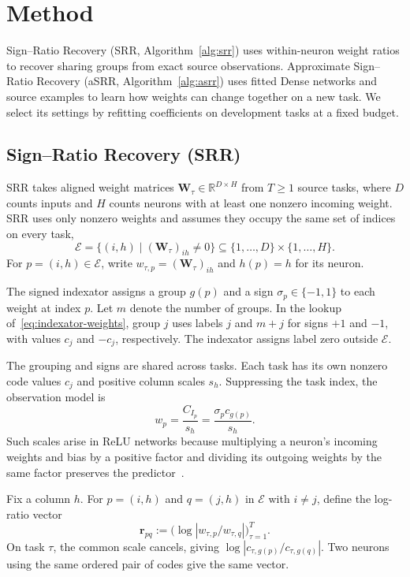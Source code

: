 \section{Method}
\label{sec:method}

Sign--Ratio Recovery (SRR, Algorithm~\ref{alg:srr}) uses within-neuron
weight ratios to recover sharing groups from exact source observations.
Approximate Sign--Ratio Recovery (aSRR, Algorithm~\ref{alg:asrr})
uses fitted Dense networks and source examples to learn how weights
can change together on a new task. We select its settings by refitting
coefficients on development tasks at a fixed budget.

\subsection{Sign--Ratio Recovery (SRR)}
\label{sec:method-srr}

SRR takes aligned weight matrices $\mathbf W_\tau\in\mathbb R^{D\times H}$
from $T\ge1$ source tasks, where $D$ counts inputs and $H$ counts neurons
with at least one nonzero incoming weight. SRR uses only nonzero weights
and assumes they occupy the same set of indices on every task,
\[
    \mathcal E=\{(i,h)\mid(\mathbf W_\tau)_{ih}\ne 0\}
    \subseteq\{1,\ldots,D\}\times\{1,\ldots,H\}.
\]
For $p=(i,h)\in\mathcal E$, write
$w_{\tau,p}=(\mathbf W_\tau)_{ih}$ and $h(p)=h$ for its neuron.

The signed indexator assigns a group $g(p)$ and a sign
$\sigma_p\in\{-1,1\}$ to each weight at index $p$.
Let $m$ denote the number of groups.
In the lookup of~\eqref{eq:indexator-weights},
group $j$ uses labels $j$ and $m+j$ for signs $+1$ and $-1$, with
values $c_j$ and $-c_j$, respectively. The indexator assigns label zero
outside $\mathcal E$.

The grouping and signs are shared across tasks. Each task has its own
nonzero code values $c_j$ and positive column scales $s_h$. Suppressing
the task index, the observation model is
\begin{equation}
    w_p=\frac{C_{I_p}}{s_h}=\frac{\sigma_p c_{g(p)}}{s_h}.
    \label{eq:theory-observation}
\end{equation}
Such scales arise in ReLU networks because multiplying a neuron's
incoming weights and bias by a positive factor and dividing its
outgoing weights by the same factor preserves the
predictor~\cite[Sec.~2.3]{stock2022embedding}.

Fix a column $h$. For $p=(i,h)$ and $q=(j,h)$ in $\mathcal E$ with
$i\ne j$, define the log-ratio vector
\begin{equation}
    \mathbf r_{pq}
    :=\bigl(\log|w_{\tau,p}/w_{\tau,q}|\bigr)_{\tau=1}^T .
    \label{eq:method-srr-ratio}
\end{equation}
On task $\tau$, the common scale cancels, giving
$\log|c_{\tau,g(p)}/c_{\tau,g(q)}|$.
Two neurons using the same ordered pair of codes give the same vector.

